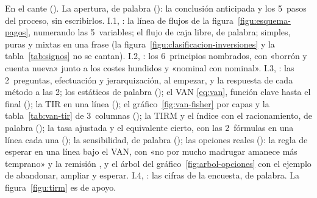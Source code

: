\documentclass[11pt]{article}
\begin{document}
\begin{notaopositor}
En el cante (). La apertura, de palabra (): la conclusión anticipada y los 5~pasos del proceso, sin escribirlos. I.1, : la línea de flujos de la figura~\ref{figu:esquema-pagos}, numerando las 5~variables; el flujo de caja libre, de palabra; simples, puras y mixtas en una frase (la figura~\ref{figu:clasificacion-inversiones} y la tabla~\ref{tab:signos} no se cantan). I.2, : los 6~principios nombrados, con «borrón y cuenta nueva» junto a los costes hundidos y «nominal con nominal». I.3, : las 2~preguntas, efectuación y jerarquización, al empezar, y la respuesta de cada método a las 2; los estáticos de palabra (); el VAN \eqref{eq:van}, función clave hasta el final (); la TIR en una línea (); el gráfico~\ref{fig:van-fisher} por capas y la tabla~\ref{tab:van-tir} de 3~columnas (); la TIRM y el índice con el racionamiento, de palabra (); la tasa ajustada y el equivalente cierto, con las 2~fórmulas en una línea cada una (); la sensibilidad, de palabra (); las opciones reales (): la regla de esperar en una línea bajo el VAN, con «no por mucho madrugar amanece más temprano» y la remisión , y el árbol del gráfico~\ref{fig:arbol-opciones} con el ejemplo de abandonar, ampliar y esperar. I.4, : las cifras de la encuesta, de palabra. La figura~\ref{figu:tirm} es de apoyo.
\end{notaopositor}
\end{document}
